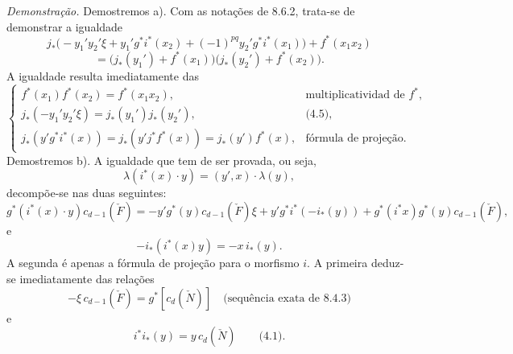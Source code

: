 \emph{Demonstração.} Demostremos a). Com as notações de 8.6.2, trata-se de demonstrar a igualdade
\[
j_*\bigl(-y_1'y_2'\xi+y_1'g^*i^*(x_2)+(-1)^{pq}y_2'g^*i^*(x_1)\bigr)+f^*(x_1x_2)
\]
\[
=\bigl(j_*(y_1')+f^*(x_1)\bigr)\bigl(j_*(y_2')+f^*(x_2)\bigr).
\]
A igualdade resulta imediatamente das
\[
\begin{cases}
f^*(x_1)f^*(x_2)=f^*(x_1x_2),&\text{multiplicatividad de }f^*,\\
j_*(-y_1'y_2'\xi)=j_*(y_1')j_*(y_2'),&\text{(4.5)},\\
j_*(y'g^*i^*(x))=j_*(y'j^*f^*(x))=j_*(y')f^*(x),&\text{fórmula de projeção}.
\end{cases}
\]
Demostremos b). A igualdade que tem de ser provada, ou seja,
\[
\lambda(i^*(x)\cdot y)=(y',x)\cdot\lambda(y),
\]
decompõe-se nas duas seguintes:
\[
g^*(i^*(x)\cdot y)c_{d-1}(\check F)
=
-y'g^*(y)c_{d-1}(\check F)\xi
+y'g^*i^*(-i_*(y))
+g^*(i^*x)g^*(y)c_{d-1}(\check F),
\]
e
\[
-i_*(i^*(x)y)=-x\,i_*(y).
\]
A segunda é apenas a fórmula de projeção para o morfismo $i$. A primeira deduz-se imediatamente das relações
\[
-\xi\,c_{d-1}(\check F)=g^*[c_d(\check N)]
\quad\text{(sequência exata de 8.4.3)}
\]
e
\[
i^*i_*(y)=y\,c_d(\check N)\qquad\text{(4.1)}.
\]
